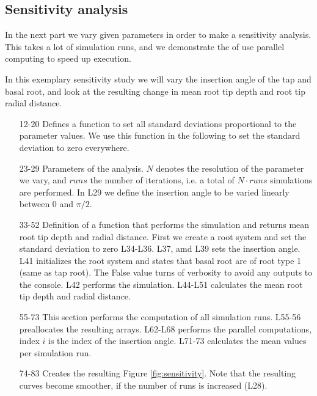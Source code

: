 \subsection{Sensitivity analysis} \label{ssec:sensitivity}

In the next part we vary given parameters in order to make a sensitivity analysis. This takes a lot of simulation runs, and we demonstrate the of use parallel computing to speed up execution.

In this exemplary sensitivity study we will vary the insertion angle of the tap and basal root, and look at the resulting change in mean root tip depth and root tip radial distance. 



\begin{itemize}

\item[12-20] Defines a function to set all standard deviations proportional to the parameter values. We use this function in the following to set the standard deviation to zero everywhere. 

\item[23-29] Parameters of the analysis. $N$ denotes the resolution of the parameter we vary, and $runs$ the number of iterations, i.e. a total of $N\cdot runs$ simulations are performed. In L29 we define the insertion angle to be varied linearly between 0 and $\pi/2$.

\item[33-52] Definition of a function that performs the simulation and returns mean root tip depth and radial distance. First we create a root system and set the standard deviation to zero L34-L36. L37, amd L39 sets the insertion angle. L41 initializes the root system and states that basal root are of root type 1 (same as tap root). The False value turns of verbosity to avoid any outputs to the console. L42 performs the simulation. L44-L51 calculates the mean root tip depth and radial distance. 

\item[55-73] This section performs the computation of all simulation runs. L55-56 preallocates the resulting arrays. L62-L68 performs the parallel computations, index $i$ is the index of the insertion angle. L71-73 calculates the mean values per simulation run.

\item[74-83] Creates the resulting Figure \ref{fig:sensitivity}. Note that the resulting curves become smoother, if the number of runs is increased (L28).

\end{itemize}

